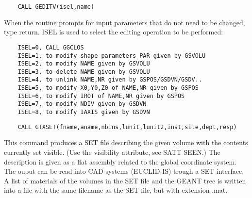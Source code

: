\ENDCMD


\BEGARG
{}
\ENDARG

\begin{verbatim}
    CALL GEDITV(isel,name)
\end{verbatim}
   \par
When the routine prompts for input parameters that do not need to be 
   changed, type return.  ISEL is used to select the editing operation to be 
   performed:  
\begin{verbatim}
    ISEL=0, CALL GGCLOS
    ISEL=1, to modify shape parameters PAR given by GSVOLU
    ISEL=2, to modify NAME given by GSVOLU
    ISEL=3, to delete NAME given by GSVOLU
    ISEL=4, to unlink NAME,NR given by GSPOS/GSDVN/GSDV..
    ISEL=5, to modify X0,Y0,Z0 of NAME,NR given by GSPOS
    ISEL=6, to modify IROT of NAME,NR given by GSPOS
    ISEL=7, to modify NDIV given by GSDVN
    ISEL=8, to modify IAXIS given by GSDVN
\end{verbatim}

\ENDCMD


\BEGARG
{}
\ENDARG

\begin{verbatim}
    CALL GTXSET(fname,aname,nbins,lunit,lunit2,inst,site,dept,resp)
\end{verbatim}
   \par
This command produces a SET file describing the given volume with the 
   contents currently set visible. (Use the visibility attribute, see SATT 
   SEEN.) The description is given as a flat assembly related to the global 
   coordinate system.  The ouput can be read into CAD systems (EUCLID-IS) 
   trough a SET interface.  A list of materials of the volumes in the SET file 
   and the GEANT tree is written into a file with the same filename as the SET 
   file, but with extension .mat.  

